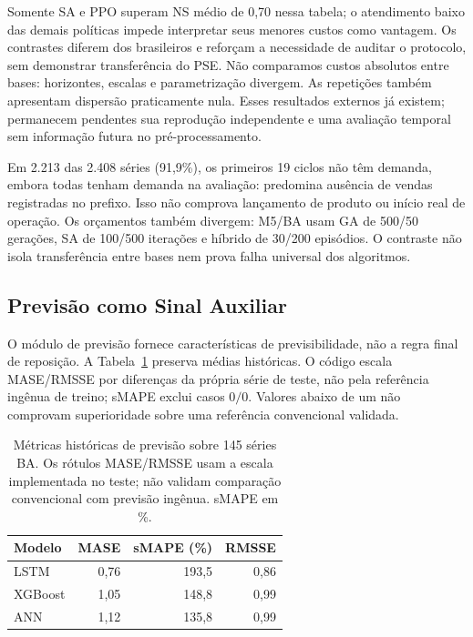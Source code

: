 Somente SA e PPO superam NS médio de 0,70 nessa tabela; o atendimento baixo das demais políticas impede interpretar seus menores custos como vantagem. Os contrastes diferem dos brasileiros e reforçam a necessidade de auditar o protocolo, sem demonstrar transferência do PSE. Não comparamos custos absolutos entre bases: horizontes, escalas e parametrização divergem. As repetições também apresentam dispersão praticamente nula. Esses resultados externos já existem; permanecem pendentes sua reprodução independente e uma avaliação temporal sem informação futura no pré-processamento.

Em 2.213 das 2.408 séries (91,9\%), os primeiros 19 ciclos não têm demanda, embora todas tenham demanda na avaliação: predomina ausência de vendas registradas no prefixo. Isso não comprova lançamento de produto ou início real de operação. Os orçamentos também divergem: M5/BA usam GA de 500/50 gerações, SA de 100/500 iterações e híbrido de 30/200 episódios. O contraste não isola transferência entre bases nem prova falha universal dos algoritmos.


\subsection{Previsão como Sinal Auxiliar}

O módulo de previsão fornece características de previsibilidade, não a regra final de reposição. A Tabela~\ref{tab:forecast_metrics} preserva médias históricas. O código escala MASE/RMSSE por diferenças da própria série de teste, não pela referência ingênua de treino; sMAPE exclui casos $0/0$. Valores abaixo de um não comprovam superioridade sobre uma referência convencional validada.

\begin{table}[ht]
\centering
\small
\caption{Métricas históricas de previsão sobre 145 séries BA. Os rótulos MASE/RMSSE usam a escala implementada no teste; não validam comparação convencional com previsão ingênua. sMAPE em \%.}
\label{tab:forecast_metrics}
\begin{tabular}{@{}lrrr@{}}
\toprule
Modelo   & MASE & sMAPE (\%) & RMSSE \\
\midrule
LSTM     & 0,76 & 193,5 & 0,86 \\
XGBoost  & 1,05 & 148,8 & 0,99 \\
ANN      & 1,12 & 135,8 & 0,99 \\
\bottomrule
\end{tabular}
\end{table}

